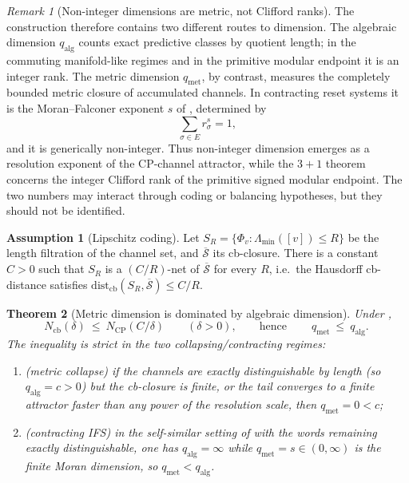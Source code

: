 \documentclass[11pt]{article}
\newtheorem{theorem}{Theorem}[section]
\theoremstyle{definition}
\newtheorem{assumption}{Assumption}[section]
\theoremstyle{remark}
\newtheorem{remark}[theorem]{Remark}
\newcommand{\CP}{\mathrm{CP}}
\newcommand{\qalg}{q_{\mathrm{alg}}}
\newcommand{\qmet}{q_{\mathrm{met}}}
\newcommand{\Lam}{\Lambda}
\newcommand{\cb}{\mathrm{cb}}
\begin{document}
\begin{remark}[Non-integer dimensions are metric, not Clifford ranks]
\label{rem:noninteger-metric-dimension}
The construction therefore contains two different routes to dimension.  The
algebraic dimension $\qalg$ counts exact predictive classes by quotient length;
in the commuting manifold-like regimes and in the primitive modular endpoint it
is an integer rank.  The metric dimension $\qmet$, by contrast, measures the
completely bounded metric closure of accumulated channels.  In contracting reset
systems it is the Moran--Falconer exponent $s$ of , determined
by
\[
  \sum_{\sigma\in E} r_\sigma^s=1,
\]
and it is generically non-integer.  Thus non-integer dimension emerges as a
resolution exponent of the CP-channel attractor, while the $3+1$ theorem concerns
the integer Clifford rank of the primitive signed modular endpoint.  The two
numbers may interact through coding or balancing hypotheses, but they should not
be identified.
\end{remark}

\begin{assumption}[Lipschitz coding]
\label{ass:lipschitz-coding}
Let $S_R=\{\Phi_v:\Lam_{\min}([v])\le R\}$ be the length filtration of the
channel set, and $\overline{\mathcal S}$ its cb-closure.  There is a constant
$C>0$ such that $S_R$ is a $(C/R)$-net of $\overline{\mathcal S}$ for every $R$,
i.e.\ the Hausdorff cb-distance satisfies $\mathrm{dist}_{\cb}(S_R,
\overline{\mathcal S})\le C/R$.
\end{assumption}

\begin{theorem}[Metric dimension is dominated by algebraic dimension]
\label{thm:qmet-qalg}
Under ,
\[
  N_{\cb}(\delta)\ \le\ N_{\CP}(C/\delta)\qquad(\delta>0),
  \qquad\text{hence}\qquad
  \boxed{\ \qmet\ \le\ \qalg.\ }
\]
The inequality is strict in the two collapsing/contracting regimes:
\begin{enumerate}[label=\textup{(\roman*)},leftmargin=2.4em]
\item \textup{(metric collapse)} if the channels are exactly distinguishable by
      length \textup{(}so $\qalg=c>0$\textup{)} but the cb-closure is finite, or
      the tail converges to a finite attractor faster than any power of the
      resolution scale, then $\qmet=0<c$;
\item \textup{(contracting IFS)} in the self-similar setting of
       with the words remaining exactly distinguishable, one
      has $\qalg=\infty$ while $\qmet=s\in(0,\infty)$ is the finite Moran
      dimension, so $\qmet<\qalg$.
\end{enumerate}
\end{theorem}
\end{document}
